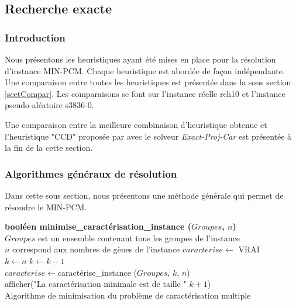 \subsection{Recherche exacte}
\label{rechercheExacte}
\subsubsection{Introduction}
Nous présentons les heuristiques ayant été mises en place pour la résolution d'instance MIN-PCM. Chaque heuristique est abordée de façon indépendante. Une comparaison entre toutes les heuristiques est présentée dans la sous section \ref{sectCompar}. Les comparaisons se font sur l'instance réelle rch10 et l'instance pseudo-aléatoire s3836-0.

Une comparaison entre la meilleure combinaison d'heuristique obtenue et l'heuristique "CCD" proposée par \cite{Chhel2013} avec le solveur \textit{Exact-Proj-Car} est présentée à la fin de la cette section.
\subsubsection{Algorithmes généraux de résolution}

Dans cette sous section, nous présentons une méthode générale qui permet de résoudre le MIN-PCM.

\begin{algorithm}
	\textbf{booléen minimise\_caractérisation\_instance ($Groupes$, $n$)}\\
	\tcp
	{
		$Groupes$ est un ensemble contenant tous les groupes de l'instance\\
		$n$ correspond aux nombres de gènes de l'instance
	}
	$caracterise \leftarrow$ VRAI\\
	$k \leftarrow n$ 
	{
		$k \leftarrow k-1$\\
		$caracterise \leftarrow $caractérise\_instance ($Groupes$, $k$, $n$)\\
	}
	afficher("La caractérisation minimale est de taille " $k+1$)\\
	\caption{Algorithme de minimisation du problème de caractérisation multiple}
	\label{algoMinPCM}
\end{algorithm}

